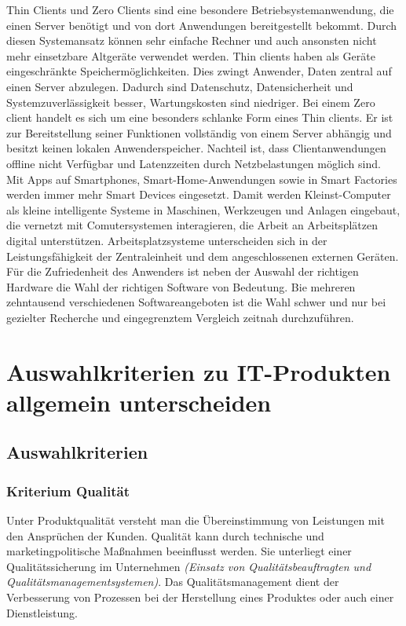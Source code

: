 \documentclass[a4paper, 12pt]{report}
\begin{document}
Thin Clients und Zero Clients sind eine besondere Betriebsystemanwendung, die
einen Server benötigt und von dort Anwendungen bereitgestellt bekommt. Durch
diesen Systemansatz können sehr einfache Rechner und auch ansonsten nicht mehr
einsetzbare Altgeräte verwendet werden. Thin clients haben als Geräte
eingeschränkte Speichermöglichkeiten. Dies zwingt Anwender, Daten zentral auf
einen Server abzulegen. Dadurch sind Datenschutz, Datensicherheit und
Systemzuverlässigkeit besser, Wartungskosten sind niedriger. Bei einem Zero
client handelt es sich um eine besonders schlanke Form eines Thin clients.
Er ist zur Bereitstellung seiner Funktionen vollständig von einem Server
abhängig und besitzt keinen lokalen Anwenderspeicher. Nachteil ist, dass
Clientanwendungen offline nicht Verfügbar und Latenzzeiten durch Netzbelastungen
möglich sind. \\

Mit Apps auf Smartphones, Smart-Home-Anwendungen sowie in Smart Factories werden
immer mehr Smart Devices eingesetzt. Damit werden Kleinst-Computer als kleine
intelligente Systeme in Maschinen, Werkzeugen und Anlagen eingebaut, die
vernetzt mit Comutersystemen interagieren, die Arbeit an Arbeitsplätzen digital
unterstützen. Arbeitsplatzsysteme unterscheiden sich in der Leistungsfähigkeit
der Zentraleinheit und dem angeschlossenen externen Geräten. \\

Für die Zufriedenheit des Anwenders ist neben der Auswahl der richtigen Hardware
die Wahl der richtigen Software von Bedeutung. Bie mehreren zehntausend
verschiedenen Softwareangeboten ist die Wahl schwer und nur bei gezielter
Recherche und eingegrenztem Vergleich zeitnah durchzuführen.

\section{Auswahlkriterien zu IT-Produkten allgemein unterscheiden}

\subsection{Auswahlkriterien}

\subsubsection{Kriterium Qualität}

Unter Produktqualität versteht man die Übereinstimmung von Leistungen mit den
Ansprüchen der Kunden. Qualität kann durch technische und marketingpolitische
Maßnahmen beeinflusst werden. Sie unterliegt einer Qualitätssicherung im
Unternehmen \emph{(Einsatz von Qualitätsbeauftragten und
Qualitätsmanagementsystemen)}. Das Qualitätsmanagement dient der Verbesserung
von Prozessen bei der Herstellung eines Produktes oder auch einer
Dienstleistung. \\
\end{document}
